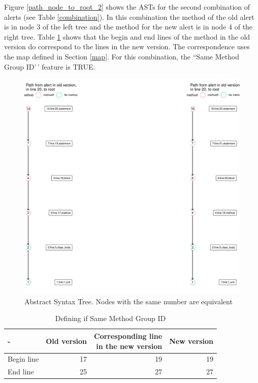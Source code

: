 \documentclass[
]{article}
\begin{document}
\normalsize

Figure \ref{path_node_to_root_2} shows the ASTs for the second
combination of alerts (see Table \ref{combination}). In this combination
the method of the old alert is in node 3 of the left tree and the method
for the new alert is in node 4 of the right tree. Table
\ref{tab_same_method_2} shows that the begin and end lines of the method
in the old version do correspond to the lines in the new version. The
correspondence uses the map defined in Section \ref{map}. For this
combination, the ``Same Method Group ID'\,' feature is TRUE.

\small

\begin{figure}[H]
\includegraphics[width=1\linewidth]{report_files/figure-latex/unnamed-chunk-10-1} \caption{Abstract Syntax Tree. Nodes with the same number are equivalent \label{path_node_to_root_2}}\label{fig:unnamed-chunk-10}
\end{figure}

\normalsize

\small

\begin{table}[H]

\caption{\label{tab:unnamed-chunk-11}Defining if Same Method Group ID \label{tab_same_method_2}}
\centering
\begin{tabular}[t]{l|r|r|r}
\hline
- & Old version & \makecell[l]{Corresponding line\\in the new version} & New version\\
\hline
Begin line & 17 & 19 & 19\\
\hline
End line & 25 & 27 & 27\\
\hline
\end{tabular}
\end{table}
\end{document}
